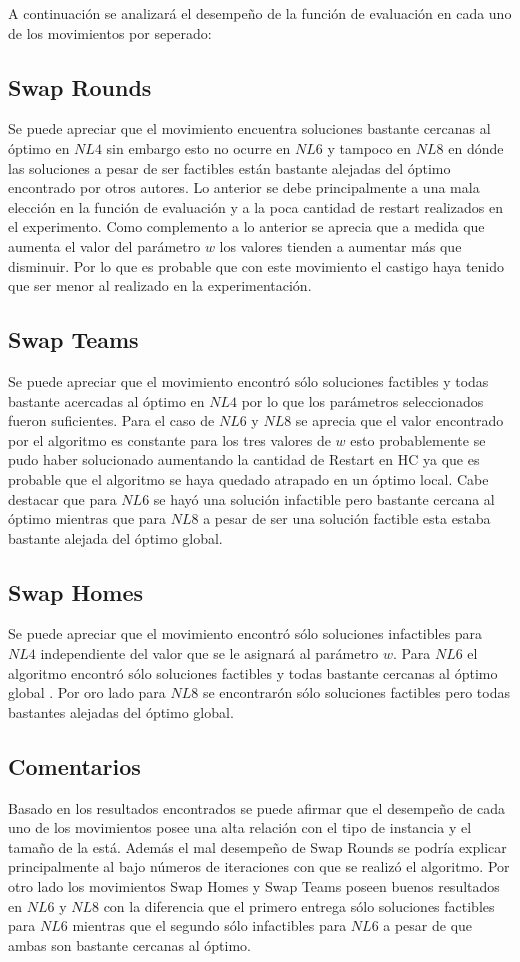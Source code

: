 \documentclass[letter, 10pt]{article}
\begin{document}
    A continuación se analizará el desempeño de la función de evaluación en cada uno de los movimientos por seperado:
\subsection{Swap Rounds}
    Se puede apreciar que el movimiento encuentra soluciones bastante cercanas al óptimo en $NL4$ sin embargo esto no ocurre en $NL6$ y tampoco en $NL8$ en dónde las soluciones a pesar de ser factibles están bastante alejadas del óptimo encontrado por otros autores. Lo anterior se debe principalmente a una mala elección en la función de evaluación y a la poca cantidad de restart realizados en el experimento. Como complemento a lo anterior  se aprecia que a medida que aumenta el valor del parámetro $w$ los valores tienden a aumentar más que disminuir. Por lo que es probable que con este movimiento el castigo haya tenido que ser menor al realizado en la experimentación.

\subsection{Swap Teams}
    Se puede apreciar que el movimiento encontró sólo soluciones factibles y todas bastante acercadas al óptimo en $NL4$ por lo que los parámetros seleccionados fueron suficientes. Para el caso de $NL6$ y $NL8$ se aprecia que el valor encontrado por el algoritmo es constante para los tres valores de $w$ esto probablemente se pudo haber solucionado aumentando la cantidad de Restart en HC ya que es probable que el algoritmo se haya quedado atrapado en un óptimo local. Cabe destacar que para $NL6$ se hayó una solución infactible pero bastante cercana al óptimo mientras que para $NL8$ a pesar de ser una solución factible esta estaba bastante alejada del óptimo global.

\subsection{Swap Homes}
    Se puede apreciar que el movimiento encontró sólo soluciones infactibles para $NL4$ independiente del valor que se le asignará al parámetro $w$. Para $NL6$ el algoritmo encontró sólo soluciones factibles y todas bastante cercanas al óptimo global . Por oro lado para $NL8$ se encontrarón sólo soluciones factibles pero todas bastantes alejadas del óptimo global.
\subsection{Comentarios}
    Basado en los resultados encontrados se puede afirmar que  el desempeño de cada uno de los movimientos posee una alta relación con el tipo de instancia y el tamaño de la está. Además el mal desempeño de Swap Rounds se podría explicar principalmente al bajo números de iteraciones con que se realizó el algoritmo. Por otro lado los movimientos Swap Homes y Swap Teams poseen buenos resultados en $NL6$ y $NL8$ con la diferencia que el primero entrega sólo soluciones factibles para $NL6$ mientras que el segundo sólo infactibles para $NL6$ a pesar de que ambas son bastante cercanas al óptimo.
    
\end{document}
